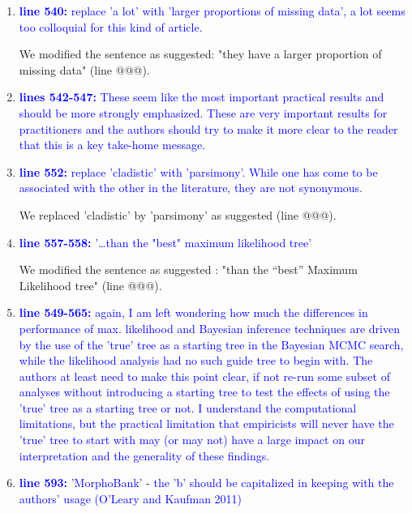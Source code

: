 \documentclass[12pt,letterpaper]{article}
\begin{document}
\begin{enumerate}

\item{\textcolor{blue}{\textbf{line 540:} replace 'a lot' with 'larger proportions of missing data', a lot seems too colloquial for this kind of article. }}

We modified the sentence as suggested: "they have a larger proportion of missing data" (line @@@).

\item{\textcolor{blue}{\textbf{lines 542-547:} These seem like the most important practical results and should be more strongly emphasized. These are very important results for practitioners and the authors should try to make it more clear to the reader that this is a key take-home message.}}


\item{\textcolor{blue}{\textbf{line 552:} replace 'cladistic' with 'parsimony'. While one has come to be associated with the other in the literature, they are not synonymous. }}

We replaced 'cladistic' by 'parsimony' as suggested (line @@@).

\item{\textcolor{blue}{\textbf{line 557-558:} '…than the "best" maximum likelihood tree'}}

We modified the sentence as suggested : "than the ``best'' Maximum Likelihood tree" (line @@@).

\item{\textcolor{blue}{\textbf{line 549-565:} again, I am left wondering how much the differences in performance of max. likelihood and Bayesian inference techniques are driven by the use of the 'true' tree as a starting tree in the Bayesian MCMC search, while the likelihood analysis had no such guide tree to begin with. The authors at least need to make this point clear, if not re-run some subset of analyses without introducing a starting tree to test the effects of using the 'true' tree as a starting tree or not. I understand the computational limitations, but the practical limitation that empiricists will never have the 'true' tree to start with may (or may not) have a large impact on our interpretation and the generality of these findings. }}


\item{\textcolor{blue}{\textbf{line 593:} 'MorphoBank' - the 'b' should be capitalized in keeping with the authors' usage (O'Leary and Kaufman 2011)}}


\end{enumerate}
\end{document}
